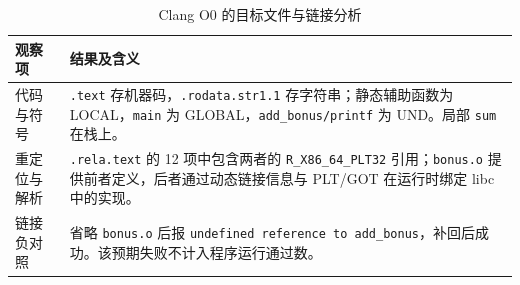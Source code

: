 \begin{table}[H]
\centering\small
\caption{Clang O0 的目标文件与链接分析}
\label{tab:link}
\begin{tabularx}{\textwidth}{L{2.5cm}Y}
\toprule{}观察项 & 结果及含义 \\
\midrule
代码与符号 & \texttt{.text} 存机器码，\texttt{.rodata.str1.1} 存字符串；静态辅助函数为 LOCAL，\texttt{main} 为 GLOBAL，\texttt{add\_bonus/printf} 为 UND。局部 \texttt{sum} 在栈上。\\
重定位与解析 & \texttt{.rela.text} 的 12 项中包含两者的 \texttt{R\_X86\_64\_PLT32} 引用；\texttt{bonus.o} 提供前者定义，后者通过动态链接信息与 PLT/GOT 在运行时绑定 libc 中的实现。\\
链接负对照 & 省略 \texttt{bonus.o} 后报 \texttt{undefined reference to add\_bonus}，补回后成功。该预期失败不计入程序运行通过数。\\
\bottomrule
\end{tabularx}
\end{table}

